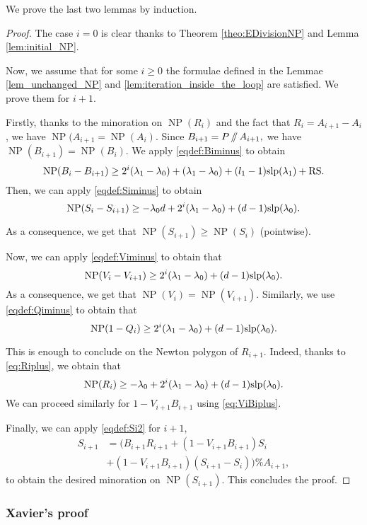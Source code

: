 \documentclass{sig-alternate-2013}
\DeclareMathOperator{\NP}{NP}
\newcommand{\slp}{\text{\rm slp}}
\newcommand{\RS}{\text{\rm RS}}
\renewcommand{\div}{\,/\hspace{-0.3em}/\,}
\begin{document}
We prove the last two lemmas by induction.

\begin{proof}
The case $i=0$ is clear thanks to Theorem \ref{theo:EDivisionNP} and Lemma \ref{lem:initial_NP}.

Now, we assume that for some $i \geq 0$ the formulae defined in the Lemmae \ref{lem_unchanged_NP} and \ref{lem:iteration_inside_the_loop} are satisfied. 
We prove them for $i+1$.

Firstly, thanks to the minoration on $\NP (R_i)$ and the fact that $R_i=A_{i+1}-A_i$, we have $\NP (A_{i+1}= \NP (A_i).$
Since $B_{i+1} = P \div A_{i+1},$ we have $\NP (B_{i+1}) = \NP (B_i).$
We apply \eqref{eqdef:Biminus} to obtain 
\[\NP (B_i-B_{i+1})  \geq 2^i (\lambda_1-\lambda_0)+(\lambda_1-\lambda_0)+(l_1-1) \slp (\lambda_1)+\RS. \]
Then, we can apply \eqref{eqdef:Siminus} to obtain 
\[\NP (S_i-S_{i+1})  \geq -\lambda_0 d+2^i (\lambda_1-\lambda_0)+(d-1) \slp (\lambda_0).\]

As a consequence, we get that $\NP (S_{i+1}) \geq \NP (S_i)$ (pointwise).

Now, we can apply \eqref{eqdef:Viminus} to obtain that 
\[\NP (V_i-V_{i+1}) \geq 2^i (\lambda_1-\lambda_0)+(d-1) \slp (\lambda_0).\]
As a consequence, we get that $\NP(V_i)=\NP(V_{i+1}).$
Similarly, we use \eqref{eqdef:Qiminus} to obtain that
\[\NP (1-Q_i)  \geq  2^i (\lambda_1-\lambda_0)+(d-1) \slp (\lambda_0).\]

This is enough to conclude on the Newton polygon of $R_{i+1}.$
Indeed, thanks to \eqref{eq:Riplus}, we obtain that 
\[\NP (R_i) \geq -\lambda_0+2^i(\lambda_1-\lambda_0)+(d-1) \slp (\lambda_0). \]
We can proceed similarly for $1-V_{i+1} B_{i+1}$ using \eqref{eq:ViBiplus}.

Finally, we can apply \eqref{eqdef:Si2} for $i+1,$
\begin{align*}
S_{i+1} & = (B_{i+1} R_{i+1} + (1-V_{i+1} B_{i+1}) S_{i} \\
& + (1-V_{i+1} B_{i+1})(S_{i+1}-S_{i})) \% A_{i+1},
\end{align*}
to obtain the desired minoration on $\NP (S_{i+1}).$ This concludes the proof.
\end{proof}

\subsubsection{Xavier's proof}
\end{document}
